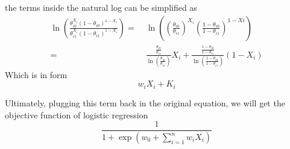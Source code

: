 \begin{enumerate}
the terms inside the natural log can be simplified as
\begin{align*}
\ln(\frac{\theta_{i0}^{X_i}(1-\theta_{i0})^{1-X_i}}{\theta_{i1}^{X_i}(1-\theta_{i1})^{1-X_i}}) 
=&\;
\ln((\frac{\theta_{i0}}{\theta_{i1}})^{X_i}(\frac{1-\theta_{i0}}{1-\theta_{i1}})^{1 - Xi})\\
=&\;
\frac{\frac{\theta_{i0}}{\theta_{i1}}}{\ln(\frac{\theta_{i0}}{\theta_{i1}})}X_i + \frac{\frac{1-\theta_{i0}}{1-\theta_{i1}}}{\ln(\frac{1-\theta_{i0}}{1-\theta_{i1}})}(1-X_i)
\end{align*}
Which is in form
\[
w_iX_i + K_i
\]

Ultimately, plugging this term back in the original equation, we will get the objective function of logistic regression
\[
\frac{1}{1 + \exp(w_0 + \sum_{i=1}^n w_iX_i)}
\]

\end{enumerate}
